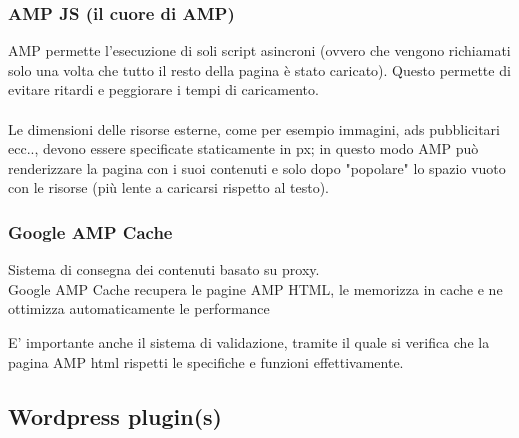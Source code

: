 \documentclass{article}
\begin{document}
    \subsubsection{AMP JS (il cuore di AMP)}
    AMP permette l'esecuzione di soli script asincroni (ovvero che vengono richiamati solo una volta che tutto il resto della pagina è stato caricato). Questo permette di evitare ritardi e peggiorare i tempi di caricamento.\\
    \\
    Le dimensioni delle risorse esterne, come per esempio immagini, ads pubblicitari ecc.., devono essere specificate staticamente in px; in questo modo AMP può renderizzare la pagina con i suoi contenuti e solo dopo "popolare" lo spazio vuoto con le risorse (più lente a caricarsi rispetto al testo).\\
    
    \subsubsection{Google AMP Cache}
    Sistema di consegna dei contenuti basato su proxy.\\
    Google AMP Cache recupera le pagine AMP HTML, le memorizza in cache e ne ottimizza automaticamente le performance
    
    E' importante anche il sistema di validazione, tramite il quale si verifica che la pagina AMP html rispetti le specifiche e funzioni effettivamente.

\subsection{Wordpress plugin(s)}



\end{document}
